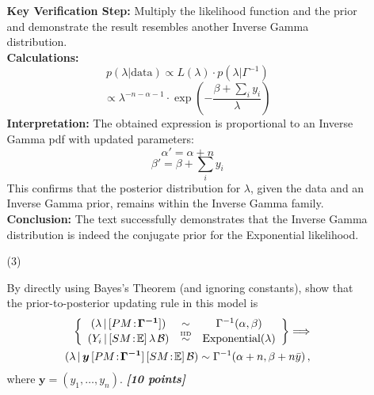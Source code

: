 \documentclass[12pt]{article}
\newcommand{\given}{\, | \,}
\newcommand{\bi}[1]{\b{\i{#1}}}
\renewcommand{\b}[1]{\textbf{#1}}
\renewcommand{\i}[1]{\textit{#1}}
\begin{document}
\begin{itemize}
\begin{itemize}
{\textbf{Key Verification Step:}
Multiply the likelihood function and the prior and demonstrate the result resembles another Inverse Gamma distribution. \\
\textbf{Calculations:}
\[ p(\lambda | \text{data}) \propto L(\lambda) \cdot p(\lambda | \Gamma^{-1}) \]
\[ \propto \lambda^{-n-\alpha-1} \cdot \exp\left(-\frac{\beta + \sum_{i} y_i}{\lambda}\right) \]
\textbf{Interpretation:}
The obtained expression is proportional to an Inverse Gamma pdf with updated parameters:
\[ \alpha' = \alpha + n \]
\[ \beta' = \beta + \sum_{i} y_i \]
This confirms that the posterior distribution for $\lambda$, given the data and an Inverse Gamma prior, remains within the Inverse Gamma family. \\
\textbf{Conclusion:}
The text successfully demonstrates that the Inverse Gamma distribution is indeed the conjugate prior for the Exponential likelihood.
}
\item[(3)]

By directly using Bayes's Theorem (and ignoring constants), show that
the prior-to-posterior updating rule in this model is
\begin{eqnarray} \label{e:updating-1}
\left\{ \begin{array}{ccc} ( \lambda \given [ PM \! : \! \bm{ \Gamma^{ -1 } } ] )& \sim & \Gamma^{ -1 } ( \alpha, \beta ) \\ ( Y_i \given [ SM \! : \! \mathbb{ E } ] \, \lambda \, \mathcal{ B } ) & \stackrel{ \mbox{\tiny IID} }{ \sim } & \textrm{Exponential} ( \lambda ) \end{array} \right\} \Longrightarrow \nonumber \\
( \lambda \given \bm{ y } \, [ PM \! : \! \bm{ \Gamma^{ -1 } } ] \, [ SM \! : \! \mathbb{ E } ] \, \mathcal{ B } ) \sim \Gamma^{ -1 } ( \alpha + n, \beta + n \bar{ y } ) \, ,
\end{eqnarray}
where $\bm{ y } = ( y_1, \dots, y_n )$. \bi{[10 points]}


\end{itemize}
\end{itemize}
\end{document}

